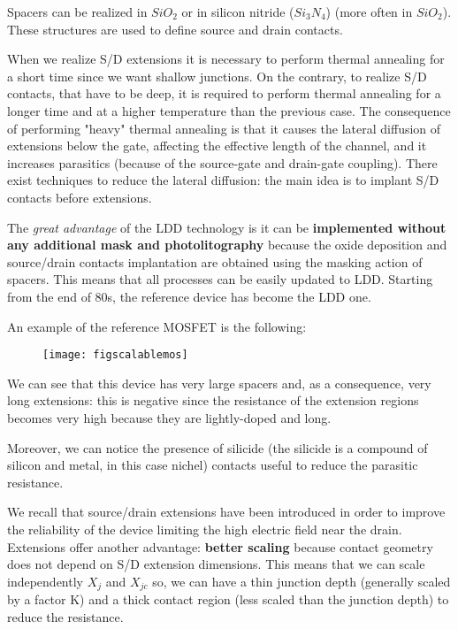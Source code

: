 \documentclass[a4paper, 12pt, twoside, openright]{report}
\begin{document}
Spacers can be realized in $SiO_{2}$ or in silicon nitride ($Si_{3}N_{4}$) (more often in $SiO_{2}$). These structures are used to define source and drain contacts.

When we realize S/D extensions it is necessary to perform thermal annealing for a short time since we want shallow junctions. On the contrary, to realize S/D contacts, that have to be deep, it is required to perform thermal annealing for a longer time and at a higher temperature than the previous case. The consequence of performing "heavy" thermal annealing is that it causes the lateral diffusion of extensions below the gate, affecting the effective length of the channel, and it increases parasitics (because of the source-gate and drain-gate coupling). There exist techniques to reduce the lateral diffusion: the main idea is to implant S/D contacts before extensions.

The \emph{great advantage} of the LDD technology is it can be \textbf{implemented without any additional mask and photolitography} because the oxide deposition and source/drain contacts implantation are obtained using the masking action of spacers. This means that all processes can be easily updated to LDD. Starting from the end of 80s, the reference device has become the LDD one. 

An example of the reference MOSFET is the following:

\newpage

	\begin{figure}[H]
	\centering
	\texttt{[image: figscalablemos]}
	\caption{}
	\label{}
	\end{figure}

We can see that this device has very large spacers and, as a consequence, very long extensions: this is negative since the resistance of the extension regions becomes very high because they are lightly-doped and long.

Moreover, we can notice the presence of silicide (the silicide is a compound of silicon and metal, in this case nichel) contacts useful to reduce the parasitic resistance.

We recall that source/drain extensions have been introduced in order to improve the reliability of the device limiting the high electric field near the drain. Extensions offer another advantage: \textbf{better scaling} because contact 
geometry does not depend on S/D extension dimensions. This means that we can scale independently $X_{j}$ and $X_{jc}$ so, we can have a thin junction depth (generally scaled by a factor K) and a thick contact region (less scaled than the junction depth) to reduce the resistance.
\end{document}
